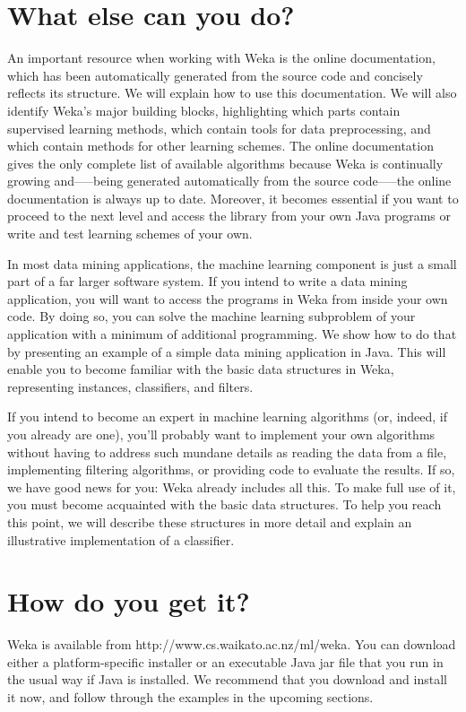 \section{What else can you do?}

An important resource when working with Weka is the online
documentation, which has been automatically generated from the source
code and concisely reflects its structure. We will explain how to use
this documentation. We will also identify Weka’s major building
blocks, highlighting which parts contain supervised learning methods,
which contain tools for data preprocessing, and which contain methods
for other learning schemes. The online documentation gives the only
complete list of available algorithms because Weka is continually
growing and--—being generated automatically from the source code--—the
online documentation is always up to date. Moreover, it becomes
essential if you want to proceed to the next level and access the
library from your own Java programs or write and test learning schemes
of your own.

In most data mining applications, the machine learning component is
just a small part of a far larger software system. If you intend to
write a data mining application, you will want to access the programs
in Weka from inside your own code. By doing so, you can solve the
machine learning subproblem of your application with a minimum of
additional programming. We show how to do that by presenting an
example of a simple data mining application in Java. This will enable
you to become familiar with the basic data structures in Weka,
representing instances, classifiers, and filters.

If you intend to become an expert in machine learning algorithms (or,
indeed, if you already are one), you’ll probably want to implement
your own algorithms without having to address such mundane details as
reading the data from a file, implementing filtering algorithms, or
providing code to evaluate the results. If so, we have good news for
you: Weka already includes all this. To make full use of it, you must
become acquainted with the basic data structures. To help you reach
this point, we will describe these structures in more detail and
explain an illustrative implementation of a classifier.

\section{How do you get it?}

Weka is available from http://www.cs.waikato.ac.nz/ml/weka. You can
download either a platform-speciﬁc installer or an executable Java jar
ﬁle that you run in the usual way if Java is installed. We recommend
that you download and install it now, and follow through the examples
in the upcoming sections.

